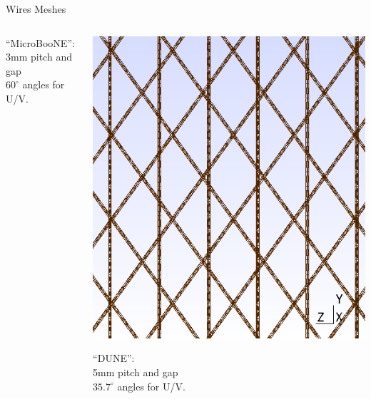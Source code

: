 \documentclass[xcolor=dvipsnames]{beamer}
\newcommand{\microboone}{MicroBooNE\xspace}
\begin{document}
\begin{frame}{Wires Meshes}
\begin{columns}
\begin{column}{0.3\textwidth}
\begin{center}
        ``\microboone'':\\3mm pitch and gap\\$60^\circ$ angles for U/V.
      \end{center}
    \end{column}
    \begin{column}{0.3\textwidth}
      \begin{center}
        \includegraphics[height=0.4\textheight]{dune-mesh.png}      

        ``DUNE'':\\5mm pitch and gap\\$35.7^\circ$ angles for U/V.
      \end{center}
    \end{column}
  \end{columns}
\end{frame}
\end{document}
